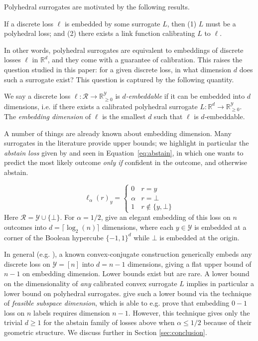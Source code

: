 \documentclass[anon]{colt2020} %
\newcommand{\Comments}{1}
\newcommand{\mynote}[2]{\ifnum\Comments=1\textcolor{#1}{#2}\fi}
\newcommand{\jessie}[1]{\mynote{purple}{[JF: #1]}}
\newcommand{\bo}[1]{\mynote{blue}{[Bo: #1]}}
\newcommand{\reals}{\mathbb{R}}
\newcommand{\nonnegreals}{\reals_{\geq 0}}%
\newcommand{\R}{\mathcal{R}}
\newcommand{\Y}{\mathcal{Y}}
\newcommand{\ellabs}[1]{\ell_{#1}}
\begin{document}
Polyhedral surrogates are motivated by the following results.
\begin{theorem} \label{thm:embed-iff-poly}
  If a discrete loss $\ell$ is embedded by some surrogate $L$, then (1) $L$ must be a polyhedral loss; and (2) there exists a link function calibrating $L$ to $\ell$.
\end{theorem}
In other words, polyhedral surrogates are equivalent to embeddings of discrete losses $\ell$ in $\reals^d$, and they come with a guarantee of calibration.
This raises the question studied in this paper: for a given discrete loss, in what dimension $d$ does such a surrogate exist?
This question is captured by the following quantity.

\begin{definition}
  We say a discrete loss $\ell: \R \to \nonnegreals^{\Y}$ is \emph{$d$-embeddable} if it can be embedded into $d$ dimensions, i.e. if there exists a calibrated polyhedral surrogate $L: \reals^d \to \nonnegreals^{\Y}$.
  The \emph{embedding dimension} of $\ell$ is the smallest $d$ such that $\ell$ is $d$-embeddable.
\end{definition}

A number of things are already known about embedding dimension.
Many surrogates in the literature provide upper bounds; we highlight in particular the \emph{abstain loss} given by \cite{ramaswamy2018consistent} and seen in Equation~\eqref{eq:abstain}, in which one wants to predict the most likely outcome \emph{only if} confident in the outcome, and otherwise abstain.

\begin{equation}\label{eq:abstain}
\ellabs{\alpha}(r)_y = \begin{cases}
0 & r = y\\
\alpha & r = \bot\\
1 & r \not \in \{y, \bot\}
\end{cases}
\end{equation}
Here $\R = \Y \cup \{\bot\}$.
For $\alpha=1/2$, \cite{ramaswamy2018consistent} give an elegant embedding of this loss on $n$ outcomes into $d = \lceil \log_2 (n) \rceil$ dimensions, where each $y \in \Y$ is embedded at a corner of the Boolean hypercube $\{-1,1\}^d$ while $\bot$ is embedded at the origin.

In general (e.g. \cite{finocchiaro2019embedding}), a known convex-conjugate construction generically embeds any discrete loss on $\Y = [n]$ into $d = n-1$ dimensions, giving a flat upper bound of $n-1$ on embedding dimension.
Lower bounds exist but are rare.
A lower bound on the dimensionality of \emph{any} calibrated convex surrogate $L$ implies in particular a lower bound on polyhedral surrogates.
\cite{ramaswamy2016convex} give such a lower bound via the technique of \emph{feasible subspace dimension}, which is able to e.g. prove that embedding $0-1$ loss on $n$ labels requires dimension $n-1$.
However, this technique gives only the trivial $d \geq 1$ for the abstain family of losses above when $\alpha \leq 1/2$ because of their geometric structure.
We discuss further in Section \ref{sec:conclusion}.
\end{document}
